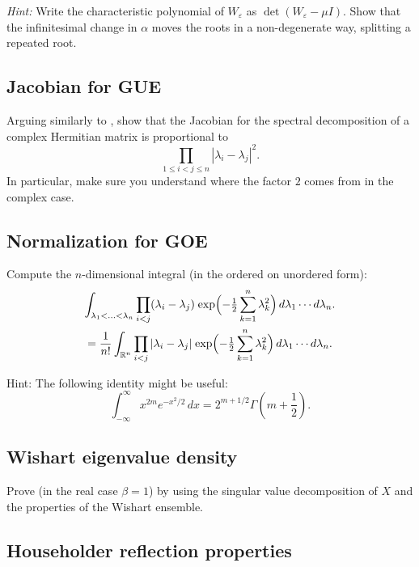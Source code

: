 \documentclass[letterpaper,11pt,oneside,reqno]{article}
\numberwithin{equation}{section}
\newcommand{\ssp}{\hspace{1pt}}
\theoremstyle{definition}
\begin{document}
\medskip
\noindent
\emph{Hint:}
Write the characteristic polynomial of \(W_{\varepsilon}\) as \(\det(W_{\varepsilon}-\mu I)\). Show that the infinitesimal change in \(\alpha\) moves the roots in a non-degenerate way, splitting a repeated root.



\subsection{Jacobian for GUE}
\label{prob:Jacobian-GUE}

Arguing similarly to
,
show that the Jacobian for the spectral decomposition
of a complex Hermitian matrix is proportional to
\begin{equation*}
	\prod_{1\le i<j\le n}|\lambda_i-\lambda_j|^2.
\end{equation*}
In particular, make sure you understand
where the factor $2$ comes from in the complex case.

\subsection{Normalization for GOE}
\label{prob:GOE-normalization}

Compute the $n$-dimensional integral
(in the ordered on unordered form):
\begin{multline*}
	\int_{\lambda_1<\ldots<\lambda_n } \prod_{i<j}(\lambda_i-\lambda_j)
	\ssp
	\exp\Bigl(-\tfrac{1}{2}\sum_{k=1}^n \lambda_k^2\Bigr)\,d\lambda_1\cdots d\lambda_n.\\=
	\frac{1}{n!}
	\int_{\mathbb{R}^n}
	\prod_{i<j}|\lambda_i-\lambda_j|\ssp
	\exp\Bigl(-\tfrac{1}{2}\sum_{k=1}^n \lambda_k^2\Bigr)\,d\lambda_1\cdots d\lambda_n.
\end{multline*}

\medskip
\noindent
Hint: The following identity might be useful:
\[
\int_{-\infty}^{\infty} x^{2m} e^{-x^2/2} \, dx = 2^{m+1/2} \Gamma \left( m + \frac{1}{2} \right).
\]


\subsection{Wishart eigenvalue density}

Prove  (in the real case $\beta=1$)
by using the singular
value
decomposition
of \(X\) and the properties of the Wishart ensemble.


\subsection{Householder reflection properties}
\label{prob:householder-properties}
\end{document}
